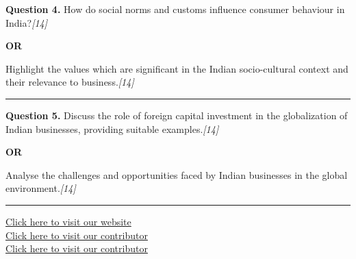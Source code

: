\documentclass[11pt,a4paper]{article}
\newcommand{\pts}[1]{\hfill   \textit{[#1]}}
\begin{document}
\noindent   \textbf{Question 4.}
How do social norms and customs influence consumer behaviour in India?\pts{14}

\centerline{   \textbf{OR}}

Highlight the values which are significant in the Indian socio-cultural context and their relevance to business.\pts{14}

\medskip\rule{\linewidth}{0.2pt}




\noindent   \textbf{Question 5.}
Discuss the role of foreign capital investment in the globalization of Indian businesses, providing suitable examples.\pts{14}

\centerline{   \textbf{OR}}

Analyse the challenges and opportunities faced by Indian businesses in the global environment.\pts{14}

\vfill
\rule{\linewidth}{0.4pt}

\begin{center}\small
\href{https://bhu-exam.vercel.app/}{Click here to visit our website}\\[4pt]
\href{https://me-aryan.vercel.app/}{Click here to visit our contributor}\\[4pt]
\href{https://quashan-me.vercel.app/}{Click here to visit our contributor}
\end{center}
\end{document}
